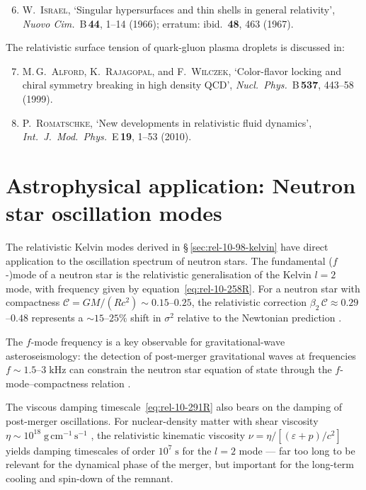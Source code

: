 \begin{enumerate}
\setcounter{enumi}{5}
\item \textsc{W.\ Israel},
  `Singular hypersurfaces and thin shells in general relativity',
  \textit{Nuovo Cim.}\ B\,\textbf{44}, 1--14 (1966);
  erratum: ibid.\ \textbf{48}, 463 (1967).
\end{enumerate}

\noindent
The relativistic surface tension of quark-gluon plasma droplets
is discussed in:

\begin{enumerate}
\setcounter{enumi}{6}
\item \textsc{M.\,G.\ Alford}, \textsc{K.\ Rajagopal},
  and \textsc{F.\ Wilczek},
  `Color-flavor locking and chiral symmetry breaking in
  high density QCD',
  \textit{Nucl.\ Phys.}\ B\,\textbf{537}, 443--58 (1999).

\item \textsc{P.\ Romatschke},
  `New developments in relativistic fluid dynamics',
  \textit{Int.\ J.\ Mod.\ Phys.}\ E\,\textbf{19}, 1--53 (2010).
\end{enumerate}

\section{Astrophysical application: Neutron star oscillation modes}
\label{sec:rel-10-98-astro}

The relativistic Kelvin modes derived in
\S\,\ref{sec:rel-10-98-kelvin} have direct application to the
oscillation spectrum of neutron stars.  The fundamental ($f$-)mode
of a neutron star is the relativistic generalisation of the Kelvin
$l = 2$ mode, with frequency given by
equation~\eqref{eq:rel-10-258R}.  For a neutron star with
compactness $\mathcal{C} = GM/(Rc^{2}) \sim 0.15$--$0.25$, the
relativistic correction $\beta_{2}\,\mathcal{C} \approx 0.29$--$0.48$
represents a $\sim 15$--$25\%$ shift in $\sigma^{2}$ relative to
the Newtonian prediction \citep{AnderssonKokkotas1998}.

The $f$-mode frequency is a key observable for gravitational-wave
asteroseismology: the detection of post-merger gravitational waves
at frequencies $f \sim 1.5$--$3\;\mathrm{kHz}$ can constrain the
neutron star equation of state through the
$f$-mode--compactness relation \citep{Bauswein2012,Takami2015}.

The viscous damping timescale~\eqref{eq:rel-10-291R} also bears on
the damping of post-merger oscillations.  For nuclear-density matter
with shear viscosity $\eta \sim 10^{18}\;\mathrm{g\,cm^{-1}\,s^{-1}}$
\citep{Alford2018}, the relativistic kinematic viscosity
$\nu = \eta/[(\varepsilon + p)/c^{2}]$ yields damping timescales of
order $10^{7}\;\mathrm{s}$ for the $l = 2$ mode --- far too long to
be relevant for the dynamical phase of the merger, but important for
the long-term cooling and spin-down of the remnant.

